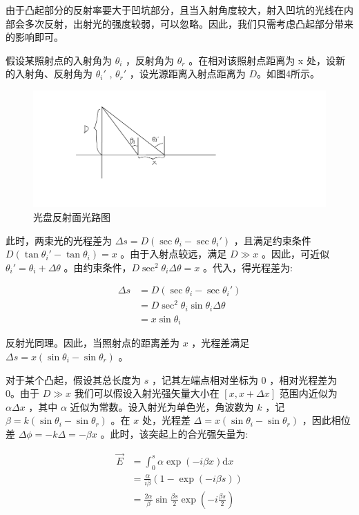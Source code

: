 \documentclass[fontset=windows]{article}
\begin{document}
由于凸起部分的反射率要大于凹坑部分，且当入射角度较大，射入凹坑的光线在内部会多次反射，出射光的强度较弱，可以忽略。因此，我们只需考虑凸起部分带来的影响即可。

假设某照射点的入射角为 $\theta_i$ ，反射角为 $\theta_r$ 。在相对该照射点距离为 x 处，设新的入射角、反射角为 $\theta_i'$ , $\theta_r'$ ，设光源距离入射点距离为 $D$。如图4所示。

\begin{figure}[htbp]
	\centering
	\includegraphics[scale=0.2]{3.png}
	\caption{光盘反射面光路图}
	\label{4}
\end{figure}

此时，两束光的光程差为 $\Delta s = D(\sec\theta_i - \sec\theta_i')$ ，且满足约束条件 $D(\tan\theta_i'-\tan\theta_i) = x$ 。由于入射点较远，满足 $D \gg x$ 。因此，可近似 $\theta_i' = \theta_i + \Delta\theta$ 。由约束条件，$D\sec^2\theta_i \Delta\theta = x$ 。代入，得光程差为:

$$
\begin{aligned}
    \Delta s &= D(\sec\theta_i - \sec\theta_i')\\
             &= D\sec^2\theta_i \sin\theta_i \Delta\theta \\
             &= x\sin\theta_i
\end{aligned}
$$

反射光同理。因此，当照射点的距离差为 $x$ ，光程差满足 $\Delta s = x(\sin\theta_i - \sin\theta_r)$ 。

对于某个凸起，假设其总长度为 $s$ ，记其左端点相对坐标为 0 ，相对光程差为 0。由于 $D \gg x$ 我们可以假设入射光强矢量大小在 $[x,x+\Delta x]$ 范围内近似为 $\alpha \Delta x$ ，其中 $\alpha $ 近似为常数。设入射光为单色光，角波数为 $k$ ，记 $\beta = k(\sin\theta_i - \sin\theta_r)$ 。在 $x$ 处，光程差 $\Delta = x(\sin\theta_i - \sin\theta_r)$ ，因此相位差 $\Delta \phi = -k \Delta = -\beta x$ 。此时，该突起上的合光强矢量为:

$$
\begin{aligned}
    \vec{E} &= \int_0^s{\alpha \exp(-i\beta x) \mathrm{d}x} \\
            &= \frac{\alpha}{i \beta}(1 - \exp(-i\beta s))  \\
            &= \frac{2\alpha}{\beta}\sin \frac{\beta s}{2}\exp(-i\frac{\beta s}{2})
\end{aligned}
$$
\end{document}

